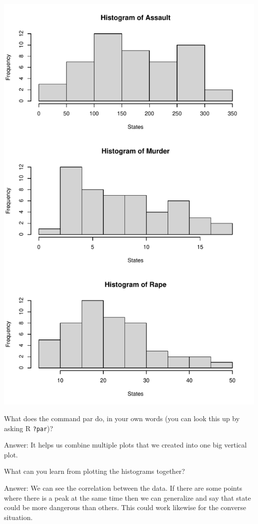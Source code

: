 \documentclass[
]{article}
\begin{document}
\includegraphics{Journal_files/figure-latex/unnamed-chunk-7-1.pdf}

What does the command par do, in your own words (you can look this up by
asking R \texttt{?par})?

Answer: It helps us combine multiple plots that we created into one big
vertical plot.

What can you learn from plotting the histograms together?

Answer: We can see the correlation between the data. If there are some
points where there is a peak at the same time then we can generalize and
say that state could be more dangerous than others. This could work
likewise for the converse situation.
\end{document}
